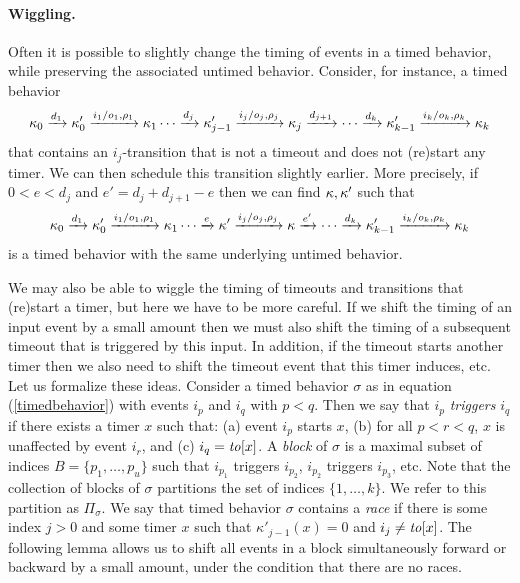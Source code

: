 \paragraph{Wiggling.}
Often it is possible to slightly change the timing of events in a timed behavior, 
while preserving the associated untimed behavior.
\iflong
Consider, for instance, a timed behavior 
\[
\kappa_0 \xrightarrow{d_1} \kappa'_0 \xrightarrow{i_1/o_1, \rho_1} \kappa_1 \cdots
\xrightarrow{d_j} \kappa'_{j-1} \xrightarrow{i_j/o_j, \rho_j} \kappa_j  \xrightarrow{d_{j+1}} \cdots
\xrightarrow{d_k} \kappa'_{k-1} \xrightarrow{i_k/o_k, \rho_k} \kappa_{k}
\]
that contains an $i_j$-transition that is not a timeout and does not (re)start any timer.
We can then schedule this transition slightly earlier.
More precisely, if $0 < e < d_j$ and $e' = d_j + d_{j+1}- e $ then we can find $\kappa, \kappa'$ such that
\[
\kappa_0 \xrightarrow{d_1} \kappa'_0 \xrightarrow{i_1/o_1, \rho_1} \kappa_1 \cdots
\xrightarrow{e} \kappa' \xrightarrow{i_j/o_j, \rho_j} \kappa  \xrightarrow{e'} \cdots
\xrightarrow{d_k} \kappa'_{k-1} \xrightarrow{i_k/o_k, \rho_k} \kappa_{k}
\]
is a timed behavior with the same underlying untimed behavior.

We may also be able to wiggle the timing of timeouts and transitions that (re)start a timer,
but here we have to be more careful.
\fi
If we shift the timing of an input event by a small amount then we must also shift the timing of a subsequent timeout
that is triggered by this input.
In addition, if the timeout starts another timer then we also need to shift the timeout event that this timer induces, etc.
%
Let us formalize these ideas. Consider a timed behavior $\sigma$ as in equation (\ref{timedbehavior})
with events $i_p$ and $i_q$ with $p < q$.
Then we say that $i_p$ \emph{triggers} $i_q$ if there exists a timer $x$ such that:
(a) event $i_p$ starts $x$, 
(b) for all $p < r < q$, $x$ is unaffected by event $i_r$, and
(c) $i_q = \mathit{to}[x]$.
A \emph{block} of $\sigma$ is a maximal subset of indices $B = \{ p_1 ,\ldots, p_u \}$ such that $i_{p_1}$ triggers $i_{p_2}$, $i_{p_2}$ triggers $i_{p_3}$, etc.
Note that the collection of blocks of $\sigma$ partitions the set of indices $\{ 1 ,\ldots, k \}$.
We refer to this partition as $\Pi_{\sigma}$.
We say that timed behavior $\sigma$ contains a \emph{race} if there is some index $j>0$ and some timer $x$  
such that $\kappa'_{j-1}(x) = 0$ and $i_j \neq \mathit{to}[x]$.
The following lemma allows us to shift all events in a block simultaneously forward or backward by a small amount, 
under the condition that there are no races.

